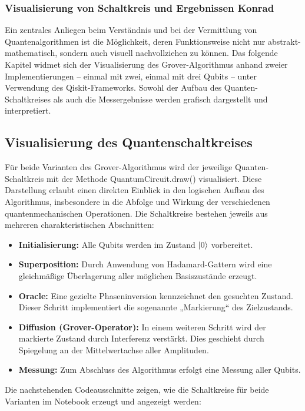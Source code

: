 \subsubsection{Visualisierung von Schaltkreis und Ergebnissen Konrad}

Ein zentrales Anliegen beim Verständnis und bei der Vermittlung von Quantenalgorithmen ist die Möglichkeit, deren Funktionsweise nicht nur abstrakt-mathematisch, sondern auch visuell nachvollziehen zu können. Das folgende Kapitel widmet sich der Visualisierung des Grover-Algorithmus anhand zweier Implementierungen – einmal mit zwei, einmal mit drei Qubits – unter Verwendung des Qiskit-Frameworks. Sowohl der Aufbau des Quanten-Schaltkreises als auch die Messergebnisse werden grafisch dargestellt und interpretiert.

\subsection*{Visualisierung des Quantenschaltkreises}

Für beide Varianten des Grover-Algorithmus wird der jeweilige Quanten-Schaltkreis mit der Methode QuantumCircuit.draw() visualisiert. Diese Darstellung erlaubt einen direkten Einblick in den logischen Aufbau des Algorithmus, insbesondere in die Abfolge und Wirkung der verschiedenen quantenmechanischen Operationen. Die Schaltkreise bestehen jeweils aus mehreren charakteristischen Abschnitten:
\begin{itemize}
    \item \textbf{Initialisierung:} Alle Qubits werden im Zustand $\ket{0}$    vorbereitet.
    \item \textbf{Superposition:} Durch Anwendung von Hadamard-Gattern wird eine gleichmäßige Überlagerung aller möglichen Basiszustände erzeugt.
    \item \textbf{Oracle:} Eine gezielte Phaseninversion kennzeichnet den gesuchten Zustand. Dieser Schritt implementiert die sogenannte „Markierung“ des Zielzustands.
    \item \textbf{Diffusion (Grover-Operator):} In einem weiteren Schritt wird der markierte Zustand durch Interferenz verstärkt. Dies geschieht durch Spiegelung an der Mittelwertachse aller Amplituden.
    \item \textbf{Messung:} Zum Abschluss des Algorithmus erfolgt eine Messung aller Qubits.
\end{itemize}
\noindent
Die nachstehenden Codeausschnitte zeigen, wie die Schaltkreise für beide
Varianten im Notebook erzeugt und angezeigt werden:

